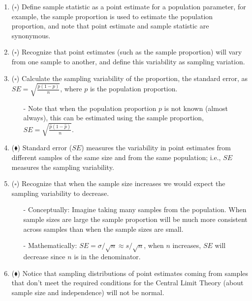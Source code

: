 \documentclass[11pt]{article}
\newcommand{\bs}{$\square$}
\newcommand{\bd}{$\blacklozenge$}
\begin{document}
\begin{enumerate}

\item (\bs) Define sample statistic as a point estimate for a population parameter, for example, the sample proportion is used to estimate the population proportion, and note that point estimate and sample statistic are synonymous.

\item (\bs) Recognize that point estimates (such as the sample proportion) will vary from one sample to another, and define this variability as sampling variation.

\item (\bs) Calculate the sampling variability of the proportion, the standard error, as $SE = \sqrt{\frac{p(1-p)}{n}}$, where $p$ is the population proportion.
\begin{itemize}
\item[-] Note that when the population proportion $p$ is not known (almost always), this can be estimated using the sample proportion, $SE = \sqrt{\frac{\hat{p}(1-\hat{p})}{n}}$.
\end{itemize}

\item (\bd) Standard error ($SE$) measures the variability in point estimates from different samples of the same size and from the same population; i.e., $SE$ measures the sampling variability.

\item (\bs) Recognize that when the sample size increases we would expect the sampling variability to decrease.
\begin{itemize}
\item[-] Conceptually: Imagine taking many samples from the population. When sample sizes are large the sample proportion will be much more consistent across samples than when the sample sizes are small.
\item[-] Mathematically: $SE = \sigma/ \sqrt{n} \approx s/\sqrt{n}$, when $n$ increases, $SE$ will decrease since $n$ is in the denominator.
\end{itemize}

\item (\bd) Notice that sampling distributions of point estimates coming from samples that don't meet the required conditions for the Central Limit Theory (about sample size and independence) will not be normal.

\end{enumerate}
\end{document}
